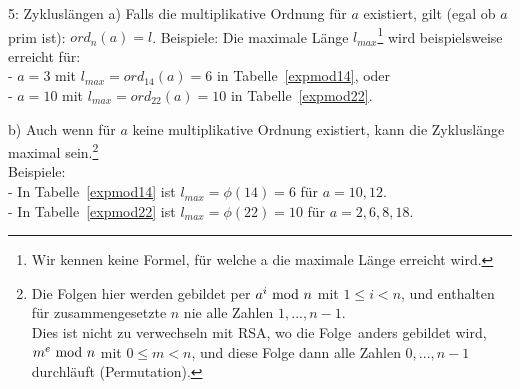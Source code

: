 \begin{refsegment}
\begin{example}{ 5: Zykluslängen}
 a) Falls die multiplikative Ordnung für $a$ existiert, gilt (egal
ob $a$ prim ist): $ord_{n}(a) = l$.
\indent Beispiele: Die maximale Länge $l_{max}$\footnote{%
            Wir kennen keine Formel, für welche a die maximale Länge erreicht wird.}
wird beispielsweise erreicht für:\\
\indent  - $a=3$ mit $l_{max} = ord_{14}(a) = 6$ in Tabelle~\ref{expmod14}, oder\\
\indent  - $a=10$ mit $l_{max} = ord_{22}(a) = 10$ in Tabelle~\ref{expmod22}.

 b) Auch wenn für $a$ keine multiplikative Ordnung existiert, kann
die Zykluslänge maximal sein.\footnote{%
         Die Folgen hier werden gebildet per $a^i{\rm ~mod~}n$ mit $1\leq i<n$,
         und enthalten für zusammengesetzte $n$ nie alle Zahlen $1, ..., n-1$.\\
         Dies ist nicht zu verwechseln mit RSA, wo die \glqq Folge\grqq~anders
         gebildet wird,  $m^e{\rm ~mod~}n$ mit $0\leq m<n$, und diese Folge
         dann alle Zahlen $0, ..., n-1$ durchläuft (Permutation).
}\\
\indent Beispiele:\\
\indent  - In Tabelle~\ref{expmod14} ist $l_{max}=\phi(14)=6$ für $a=10, 12$.\\
\indent  - In Tabelle~\ref{expmod22} ist $l_{max}=\phi(22)=10$ für $a=2, 6, 8, 18$.

\end{example}




\end{refsegment}
